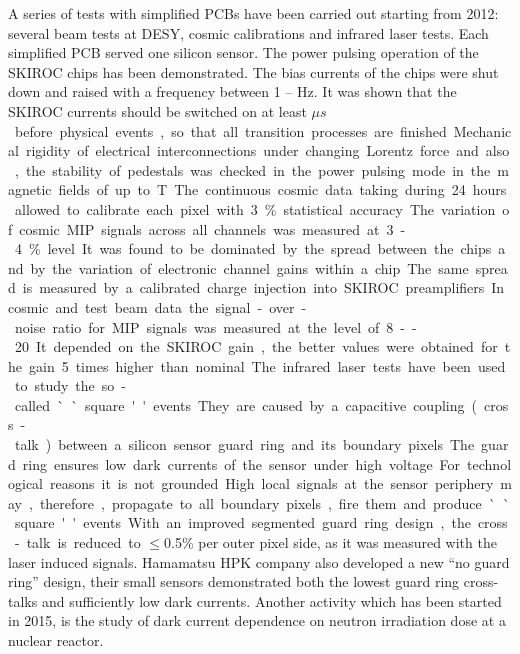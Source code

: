 A series of tests with simplified PCBs have been carried out starting from
2012: several beam tests at DESY, cosmic calibrations and infrared laser
tests. Each simplified PCB served one silicon sensor. The power pulsing
operation of the SKIROC chips has been demonstrated. The bias currents of the
chips were shut down and raised with a frequency between 1 -- \unit[20]{Hz}. It was
shown that the SKIROC currents should be switched on at least \unit[600]{$\mu s$}
before physical events, so that all transition processes are finished.
Mechanical rigidity of electrical interconnections under changing Lorentz
force and also, the stability of pedestals was checked in the power pulsing
mode in the magnetic fields of up to \unit[2]{T}. The continuous cosmic data taking
during 24 hours allowed to calibrate each pixel with 3\% statistical accuracy.
The variation of cosmic MIP signals across all channels was measured at 3-4\%
level. It was found to be dominated by the spread between the chips and by
the variation of electronic channel gains within a chip. The same spread is
measured by a calibrated charge injection into SKIROC preamplifiers. In
cosmic and test beam data the signal-over-noise ratio for MIP signals was
measured at the level of 8 -- 20. It depended on the SKIROC gain, the better
values were obtained for the gain 5 times higher than nominal.

The infrared laser tests have been used to study the so-called ``square''
events. They are caused by a capacitive coupling (cross-talk) between a
silicon sensor guard ring and its boundary pixels. The guard ring ensures low
dark currents of the sensor under high voltage. For technological reasons it
is not grounded. High local signals at the sensor periphery may, therefore,
propagate to all boundary pixels, fire them and produce ``square''
events. With an improved segmented guard ring design, the cross-talk is
reduced to $\le$0.5\% per outer pixel side, as it was measured with the laser
induced signals. Hamamatsu HPK company also developed a new ``no guard ring''
design, their small sensors demonstrated both the lowest guard ring
cross-talks and sufficiently low dark currents. Another activity which has
been started in 2015, is the study of dark current dependence on neutron
irradiation dose at a nuclear reactor.

